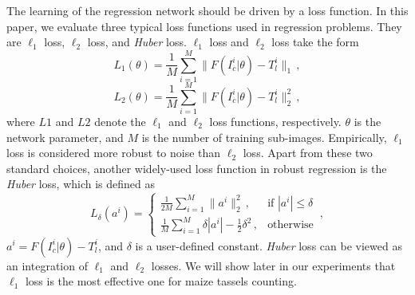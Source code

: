 \documentclass[twocolumn]{bmcart}%
\begin{document}
The learning of the regression network should be driven by a loss function. In this paper, we evaluate three typical loss functions used in regression problems. They are $\ell_1$ loss, $\ell_2$ loss, and \textit{Huber} loss. $\ell_1$ loss and $\ell_2$ loss take the form
\begin{equation}
L_1(\theta)=\frac{1}{M}\sum_{i=1}^M\|F(I_c^i|\theta)-T_l^i\|_1\,,
\end{equation}
\begin{equation}
L_2(\theta)=\frac{1}{M}\sum_{i=1}^M\|F(I_c^i|\theta)-T_l^i\|_2^2\,,
\end{equation}
where $L1$ and $L2$ denote the $\ell_1$ and $\ell_2$ loss functions, respectively. $\theta$ is the network parameter, and $M$ is the number of training sub-images. Empirically, $\ell_1$ loss is considered more robust to noise than $\ell_2$ loss. Apart from these two standard choices, another widely-used loss function in robust regression is the \textit{Huber} loss, which is defined as
\begin{equation}
L_\delta(a^i)=\begin{cases}
	\frac{1}{2M}\sum_{i=1}^M\|a^i\|^2_2\,, &\text{if }|a^i|\leq\delta\\
	\frac{1}{M}\sum_{i=1}^M\delta|a^i|-\frac{1}{2}\delta^2\,, &\text{otherwise}
	\end{cases}\,,
\end{equation}
$a^i=F(I_c^i|\theta)-T_l^i$, and $\delta$ is a user-defined constant. \textit{Huber} loss can be viewed as an integration of $\ell_1$ and $\ell_2$ losses. We will show later in our experiments that $\ell_1$ loss is the most effective one for maize tassels counting.
\end{document}
